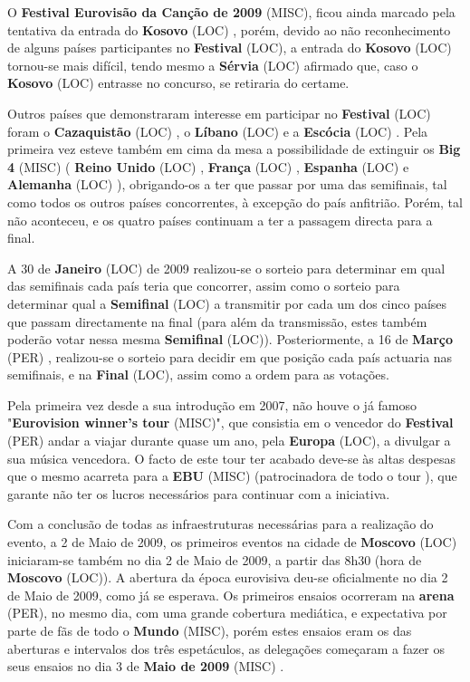 \documentclass[12pt,a4paper]{article}
\begin{document}
O \textbf{Festival Eurovisão da Canção de 2009} (MISC), ficou ainda marcado pela tentativa da entrada do \textbf{Kosovo} (LOC) , porém, devido ao não reconhecimento de alguns países participantes no \textbf{Festival} (LOC), a entrada do \textbf{Kosovo} (LOC) tornou-se mais difícil, tendo mesmo a \textbf{Sérvia} (LOC) afirmado que, caso o \textbf{Kosovo} (LOC) entrasse no concurso, se retiraria do certame.

Outros países que demonstraram interesse em participar no \textbf{Festival} (LOC) foram o \textbf{Cazaquistão} (LOC) , o \textbf{Líbano} (LOC) e a \textbf{Escócia} (LOC) . Pela primeira vez esteve também em cima da mesa a possibilidade de extinguir os \textbf{Big 4} (MISC) ( \textbf{Reino Unido} (LOC) , \textbf{França} (LOC) , \textbf{Espanha} (LOC) e \textbf{Alemanha} (LOC) ), obrigando-os a ter que passar por uma das semifinais, tal como todos os outros países concorrentes, à excepção do país anfitrião. Porém, tal não aconteceu, e os quatro países continuam a ter a passagem directa para a final.

A 30 de \textbf{Janeiro} (LOC) de 2009 realizou-se o sorteio para determinar em qual das semifinais cada país teria que concorrer, assim como o sorteio para determinar qual a \textbf{Semifinal} (LOC) a transmitir por cada um dos cinco países que passam directamente na final (para além da transmissão, estes também poderão votar nessa mesma \textbf{Semifinal} (LOC)). Posteriormente, a 16 de \textbf{Março} (PER) , realizou-se o sorteio para decidir em que posição cada país actuaria nas semifinais, e na \textbf{Final} (LOC), assim como a ordem para as votações.

Pela primeira vez desde a sua introdução em 2007, não houve o já famoso "\textbf{Eurovision winner's tour} (MISC)", que consistia em o vencedor do \textbf{Festival} (PER) andar a viajar durante quase um ano, pela \textbf{Europa} (LOC), a divulgar a sua música vencedora. O facto de este tour ter acabado deve-se às altas despesas que o mesmo acarreta para a \textbf{EBU} (MISC) (patrocinadora de todo o tour ), que garante não ter os lucros necessários para continuar com a iniciativa.

Com a conclusão de todas as infraestruturas necessárias para a realização do evento, a 2 de Maio de 2009, os primeiros eventos na cidade de \textbf{Moscovo} (LOC) iniciaram-se também no dia 2 de Maio de 2009, a partir das 8h30 (hora de \textbf{Moscovo} (LOC)). A abertura da época eurovisiva deu-se oficialmente no dia 2 de Maio de 2009, como já se esperava. Os primeiros ensaios ocorreram na \textbf{arena} (PER), no mesmo dia, com uma grande cobertura mediática, e expectativa por parte de fãs de todo o \textbf{Mundo} (MISC), porém estes ensaios eram os das aberturas e intervalos dos três espetáculos, as delegações começaram a fazer os seus ensaios no dia 3 de \textbf{Maio de 2009} (MISC) .
\end{document}
